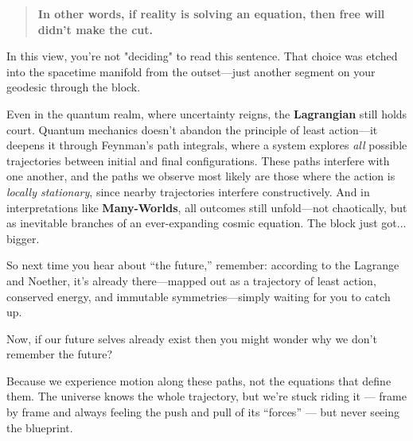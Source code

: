 \begin{tcolorbox}[colback=gray!5!white, colframe=gray!50!black, breakable, title={Historical Sidebar: The Block Universe—When Physics Froze Time}]
    \medskip
    
    \begin{quote}
    \textbf{In other words, if reality is solving an equation, then free will didn’t make the cut.}
    \end{quote}

    \medskip
    
    In this view, you’re not "deciding" to read this sentence. That choice was etched into the spacetime manifold from the outset—just another segment on your geodesic through the block.
    
    \medskip
    
    Even in the quantum realm, where uncertainty reigns, the \textbf{Lagrangian} still holds court. Quantum mechanics doesn’t abandon the principle of least action—it deepens it through Feynman’s path integrals, where a system explores \emph{all} possible trajectories between initial and final configurations. These paths interfere with one another, and the paths we observe most likely are those where the action is \emph{locally stationary}, since nearby trajectories interfere constructively. And in interpretations like \textbf{Many-Worlds}, all outcomes still unfold—not chaotically, but as inevitable branches of an ever-expanding cosmic equation. The block just got... bigger.


    \medskip
    
    So next time you hear about ``the future,'' remember: according to the Lagrange and Noether, it’s already there—mapped out as a trajectory of least action, conserved energy, and immutable symmetries—simply waiting for you to catch up.

    \medskip

    Now, if our future selves already exist then you might wonder why we don’t remember the future?

    \medskip

    Because we experience motion along these paths, not the equations that define them. The universe knows the whole trajectory, but we’re stuck riding it --- frame by frame and always feeling the push and pull of its ``forces'' --- but never seeing the blueprint.
    
\end{tcolorbox}

